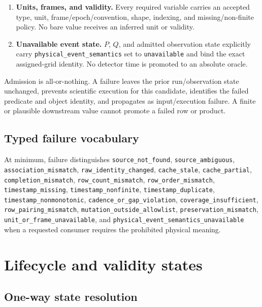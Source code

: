 \documentclass[11pt]{article}
\newcommand{\code}[1]{\texttt{#1}}
\begin{document}
\begin{enumerate}[label=\textbf{C\arabic*.}]
  allowlisted variables, their schemas are exact, and every other variable and
  dimension satisfies the preservation operator.
\item \textbf{Units, frames, and validity.} Every required variable carries an
  accepted type, unit, frame/epoch/convention, shape, indexing, and
  missing/non-finite policy.  No bare value receives an inferred unit or
  validity.
\item \textbf{Unavailable event state.} $P$, $Q$, and admitted observation
  state explicitly carry \nolinkurl{physical_event_semantics} set to
  \code{unavailable} and bind the exact assigned-grid identity.  No detector
  time is promoted to an absolute oracle.
\end{enumerate}

Admission is all-or-nothing.  A failure leaves the prior run/observation state
unchanged, prevents scientific execution for this candidate, identifies the
failed predicate and object identity, and propagates as input/execution
failure.  A finite or plausible downstream value cannot promote a failed row
or product.

\subsection{Typed failure vocabulary}

At minimum, failure distinguishes
\nolinkurl{source_not_found}, \nolinkurl{source_ambiguous},
\nolinkurl{association_mismatch}, \nolinkurl{raw_identity_changed},
\nolinkurl{cache_stale}, \nolinkurl{cache_partial},
\nolinkurl{completion_mismatch}, \nolinkurl{row_count_mismatch},
\nolinkurl{row_order_mismatch}, \nolinkurl{timestamp_missing},
\nolinkurl{timestamp_nonfinite}, \nolinkurl{timestamp_duplicate},
\nolinkurl{timestamp_nonmonotonic},
\nolinkurl{cadence_or_gap_violation},
\nolinkurl{coverage_insufficient}, \nolinkurl{row_pairing_mismatch},
\nolinkurl{mutation_outside_allowlist},
\nolinkurl{preservation_mismatch},
\nolinkurl{unit_or_frame_unavailable}, and
\nolinkurl{physical_event_semantics_unavailable} when a requested consumer
requires the prohibited physical meaning.

\section{Lifecycle and validity states}

\subsection{One-way state resolution}
\end{document}
